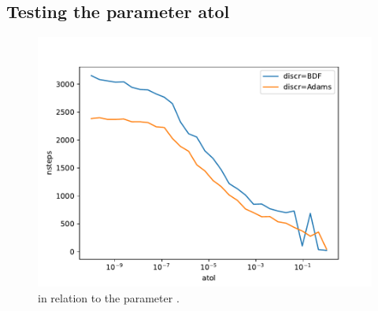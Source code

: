 \documentclass{report}
\begin{document}
\newpage

\subsection*{Testing the parameter atol}

\begin{figure}
\centering
\vspace*{-0.8cm}
\begin{minipage}[t]{0.45\textwidth}
\centering
\includegraphics[width=\textwidth]{../Plots/Task4/Figure_400}
\caption{ in relation to the parameter .}
\label{pl:nsteps3}
\end{minipage}
\vspace*{1cm}
\end{figure}
\end{document}

